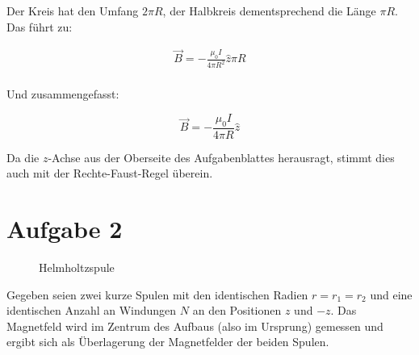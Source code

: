 \documentclass[a4paper,german,12pt,smallheadings]{scrartcl}
\begin{document}
Der Kreis hat den Umfang $2 \pi R$, der Halbkreis dementsprechend die Länge
$\pi R$. Das führt zu:

\begin{align}
  \vec{B} = -\frac{\mu_0 I}{4 \pi R^2} \widehat{z} \pi R \\
\end{align}

Und zusammengefasst:

\begin{equation}
  \vec{B} = -\frac{\mu_0 I}{4 \pi R} \widehat{z}
\end{equation}

Da die $z$-Achse aus der Oberseite des Aufgabenblattes herausragt, stimmt dies
auch mit der Rechte-Faust-Regel überein.

\section*{Aufgabe 2}

\begin{figure}[H]
  \begin{center}
  \end{center}
  \caption{Helmholtzspule}
\end{figure}

Gegeben seien zwei kurze Spulen mit den identischen Radien $r = r_1 = r_2$ und
eine identischen Anzahl an Windungen $N$ an den Positionen $z$ und $-z$. Das
Magnetfeld wird im Zentrum des Aufbaus (also im Ursprung) gemessen und ergibt
sich als Überlagerung der Magnetfelder der beiden Spulen.
\end{document}
